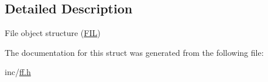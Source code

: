 \subsection{Detailed Description}
File object structure (\hyperlink{structFIL}{F\+IL}) 

The documentation for this struct was generated from the following file\+:\begin{DoxyCompactItemize}
\item 
inc/\hyperlink{ff_8h}{ff.\+h}\end{DoxyCompactItemize}
